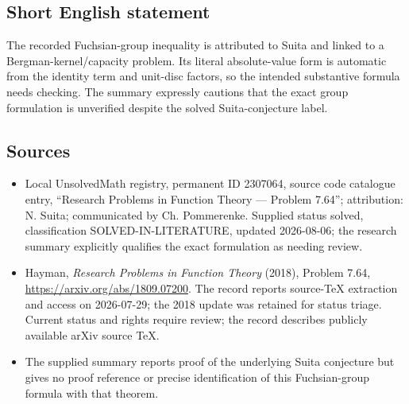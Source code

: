 \documentclass[11pt]{article}
\begin{document}
\subsection{Short English statement}
The recorded Fuchsian-group inequality is attributed to Suita and linked to a Bergman-kernel/capacity problem. Its literal absolute-value form is automatic from the identity term and unit-disc factors, so the intended substantive formula needs checking. The summary expressly cautions that the exact group formulation is unverified despite the solved Suita-conjecture label.
\subsection{Sources}
\begin{itemize}
\item Local UnsolvedMath registry, permanent ID 2307064, source code catalogue entry, ``Research Problems in Function Theory --- Problem 7.64''; attribution: N. Suita; communicated by Ch. Pommerenke. Supplied status solved, classification SOLVED-IN-LITERATURE, updated 2026-08-06; the research summary explicitly qualifies the exact formulation as needing review.
\item Hayman, \emph{Research Problems in Function Theory} (2018), Problem 7.64, \url{https://arxiv.org/abs/1809.07200}. The record reports source-TeX extraction and access on 2026-07-29; the 2018 update was retained for status triage. Current status and rights require review; the record describes publicly available arXiv source TeX.
\item The supplied summary reports proof of the underlying Suita conjecture but gives no proof reference or precise identification of this Fuchsian-group formula with that theorem.
\end{itemize}
\end{document}
